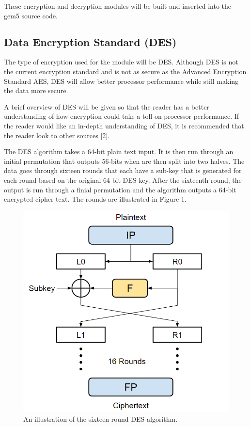 \documentclass[letterpaper, 10pt, conference]{ieeeconf}  %
\begin{document}
These encryption and decryption modules will be built and inserted into the gem5 source code.

\subsection{Data Encryption Standard (DES)}

The type of encryption used for the module will be DES.  Although DES is not the current encryption standard and is not as secure as the Advanced Encryption Standard AES, DES will allow better processor performance while still making the data more secure.

A brief overview of DES will be given so that the reader has a better understanding of how encryption could take a toll on processor performance.  If the reader would like an in-depth understanding of DES, it is recommended that the reader look to other sources [2].

The DES algorithm takes a 64-bit plain text input.  It is then run through an initial permutation that outputs 56-bits when are then split into two halves.  The data goes through sixteen rounds that each have a sub-key that is generated for each round based on the original 64-bit DES key.  After the sixteenth round, the output is run through a finial permutation and the algorithm outputs a 64-bit encrypted cipher text.  The rounds are illustrated in Figure 1.

\begin{figure}[thpb]
	\centering
	\includegraphics[scale=.50]{DesRounds}
    \caption{An illustration of the sixteen round DES algorithm.}
\end{figure}
\end{document}
